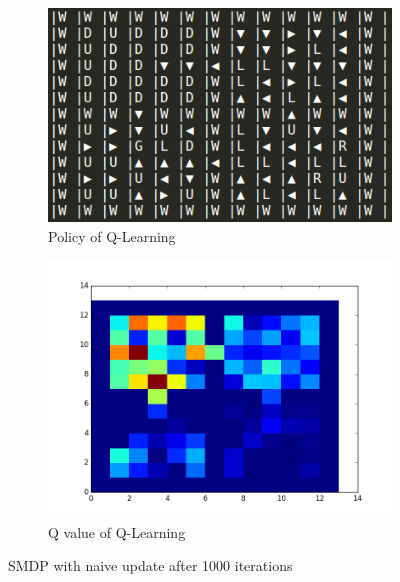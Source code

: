 \documentclass[]{article}
\begin{document}
\begin{figure}
	\centering
	\begin{subfigure}[b]{0.475\textwidth}
		\includegraphics[width=\linewidth]{naive_update_policy.png}
		\caption{Policy of Q-Learning}
	\end{subfigure}
	\begin{subfigure}[b]{0.475\textwidth}
		\centering
		\includegraphics[width=.9\linewidth]{naive_update_value_plot.png}
		\caption{Q value of Q-Learning}
	\end{subfigure}
	\caption{SMDP with naive update after 1000 iterations}
\end{figure}
\end{document}
